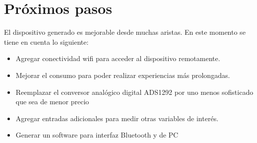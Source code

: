 \section{Próximos pasos}

El dispositivo generado es mejorable desde muchas aristas. En este momento se tiene en cuenta lo siguiente:

\begin{itemize}

\item Agregar conectividad wifi para acceder al dispositivo remotamente.

\item Mejorar el consumo para poder realizar experiencias más prolongadas.

\item Reemplazar el conversor analógico digital ADS1292 por uno menos sofisticado que sea de menor precio

\item Agregar entradas adicionales para medir otras variables de interés.

\item Generar un software para interfaz Bluetooth y de PC

\end{itemize}